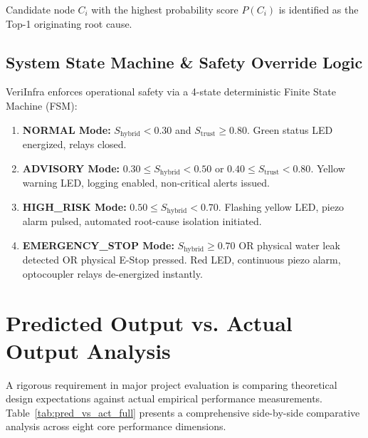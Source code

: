 \documentclass[conference]{IEEEtran}
\begin{document}
Candidate node $C_i$ with the highest probability score $P(C_i)$ is identified as the Top-1 originating root cause.

\subsection{System State Machine \& Safety Override Logic}
VeriInfra enforces operational safety via a 4-state deterministic Finite State Machine (FSM):
\begin{enumerate}
    \item \textbf{NORMAL Mode:} $S_{\text{hybrid}} < 0.30$ and $S_{\text{trust}} \ge 0.80$. Green status LED energized, relays closed.
    \item \textbf{ADVISORY Mode:} $0.30 \le S_{\text{hybrid}} < 0.50$ or $0.40 \le S_{\text{trust}} < 0.80$. Yellow warning LED, logging enabled, non-critical alerts issued.
    \item \textbf{HIGH\_RISK Mode:} $0.50 \le S_{\text{hybrid}} < 0.70$. Flashing yellow LED, piezo alarm pulsed, automated root-cause isolation initiated.
    \item \textbf{EMERGENCY\_STOP Mode:} $S_{\text{hybrid}} \ge 0.70$ OR physical water leak detected OR physical E-Stop pressed. Red LED, continuous piezo alarm, optocoupler relays de-energized instantly.
\end{enumerate}

\section{Predicted Output vs. Actual Output Analysis}
\label{sec:pred_vs_act}
A rigorous requirement in major project evaluation is comparing theoretical design expectations against actual empirical performance measurements. Table~\ref{tab:pred_vs_act_full} presents a comprehensive side-by-side comparative analysis across eight core performance dimensions.
\end{document}
